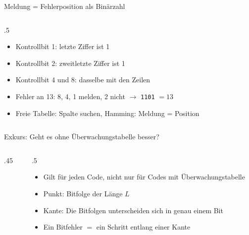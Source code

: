 \begin{frame}{Meldung = Fehlerposition als Binärzahl}
\begin{columns}
\begin{column}{.5\textwidth}
\begin{itemize}
                \item<3-> Kontrollbit 1: letzte Ziffer ist 1
                \item<4-> Kontrollbit 2: zweitletzte Ziffer ist 1
                \item<5-> Kontrollbit 4 und 8: dasselbe mit den Zeilen
                \item<7-> Fehler an 13: 8, 4, 1 melden, 2 nicht $\rightarrow$ \texttt{1101} $=13$
                \item<8-> Freie Tabelle: Spalte suchen, Hamming: Meldung = Position
            \end{itemize}
        \end{column}
    \end{columns}
\end{frame}


\begin{frame}{Exkurs: Geht es ohne Überwachungstabelle besser?}
    \begin{columns}
        \begin{column}{.45\textwidth}
            \begin{center}
            \end{center}
        \end{column}
        \begin{column}{.5\textwidth}
            \begin{itemize}[<+->]
                \item Gilt für jeden Code, nicht nur für Codes mit Überwachungstabelle
                \item Punkt: Bitfolge der Länge \(L\)
                \item Kante: Die Bitfolgen unterscheiden sich in genau einem Bit
                \item Ein Bitfehler $=$ ein Schritt entlang einer Kante
            \end{itemize}
        \end{column}
    \end{columns}
\end{frame}


